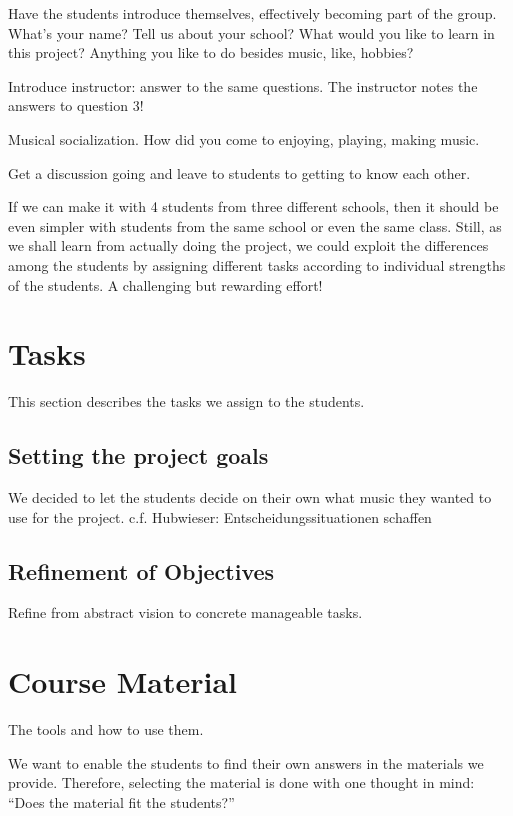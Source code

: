 \documentclass[onecolumn,nocopyrightspace,preprint]{sigplanconf}
\begin{document}
Have the students introduce themselves, effectively becoming part of the group.
What's your name? Tell us about your
school? What would you like to learn in this project? Anything you like to do besides
music, like, hobbies?

Introduce instructor: answer to the same questions.
The instructor notes the answers to question 3!


Musical socialization. How did you come to enjoying, playing, making music.

Get a discussion going and leave to students to getting to know each other.


If we can make it with 4 students from three different schools, then it should
be even simpler with students from the same school or even the same class.
Still, as we shall learn from actually doing the project, we could exploit the
differences among the students by assigning different tasks according to
individual strengths of the students. A challenging but rewarding effort!


\section{Tasks}

This section describes the tasks we assign to the students.

\subsection{Setting the project goals}

We decided to let the students decide on their own what music they wanted to use for the project.
c.f. Hubwieser: Entscheidungssituationen schaffen


\subsection{Refinement of Objectives}

Refine from abstract vision to concrete manageable tasks.


\section{Course Material}

The tools and how to use them.

We want to enable the students to find their own answers in the materials
we provide. Therefore, selecting the material is done with one thought
in mind: ``Does the material fit the students?''
\end{document}
